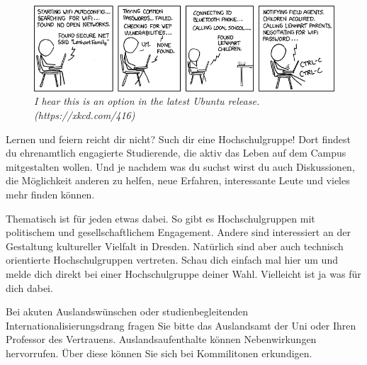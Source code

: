 \begin{figure}[b]
	\centering
	\includegraphics[width=\textwidth, keepaspectratio]{img/xkcd/zealous_autoconfig.png}
	\caption*{{\small \textit{I hear this is an option in the latest Ubuntu release. (https://xkcd.com/416)}}}
\end{figure}


Lernen und feiern reicht dir nicht? 
Such dir eine Hochschulgruppe!
Dort findest du ehrenamtlich engagierte Studierende, die aktiv das Leben auf
dem Campus mitgestalten wollen.
Und je nachdem was du suchst wirst du auch Diskussionen, die Möglichkeit anderen zu helfen, neue Erfahren, interessante Leute und vieles mehr finden können.

Thematisch ist für jeden etwas dabei. 
So gibt es Hochschulgruppen mit politischem und gesellschaftlichem Engagement. 
Andere sind interessiert an der Gestaltung kultureller Vielfalt in Dresden. 
Natürlich sind aber auch technisch orientierte Hochschulgruppen vertreten.
Schau dich einfach mal hier  um und melde dich direkt bei einer Hochschulgruppe deiner Wahl. 
Vielleicht ist ja was für dich dabei.


Bei akuten Auslandswünschen oder studienbegleitenden Internationalisierungsdrang fragen Sie bitte das Auslandsamt der Uni oder Ihren Professor des Vertrauens. 
Auslandsaufenthalte können Nebenwirkungen hervorrufen. 
Über diese können Sie sich bei Kommilitonen erkundigen.

